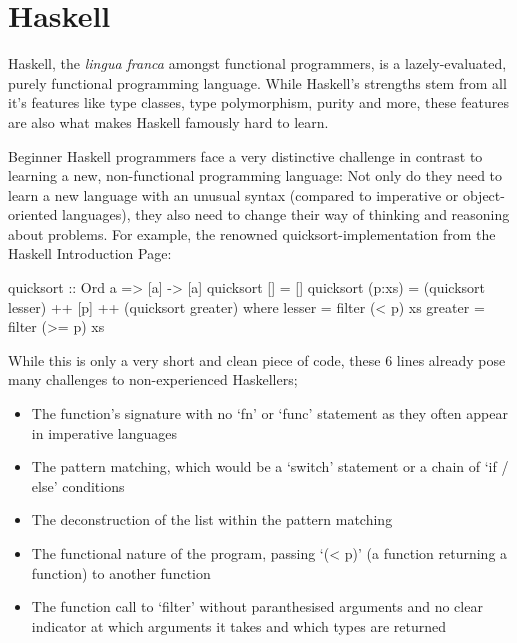 \section{Haskell}

Haskell, the \textit{lingua franca} amongst functional programmers, is a lazely-evaluated, purely functional programming
language. While Haskell's strengths stem from all it's features like type classes, type polymorphism, purity and more,
these features are also what makes Haskell famously hard to learn\autocite{haskell-hard-one}\autocite{haskell-hard-two}\autocite{haskell-hard-three}\autocite{haskell-hard-four}.

Beginner Haskell programmers face a very distinctive challenge in contrast to learning a new, non-functional programming language:
Not only do they need to learn a new language with an unusual syntax (compared to imperative or object-oriented languages), they
also need to change their way of thinking and reasoning about problems.
For example, the renowned quicksort-implementation from the Haskell Introduction Page\autocite{haskell-quicksort}:

\label{code:haskell-quicksort}
\begin{haskellcode}
quicksort :: Ord a => [a] -> [a]
quicksort []     = []
quicksort (p:xs) = (quicksort lesser) ++ [p] ++ (quicksort greater)
    where
        lesser  = filter (< p) xs
        greater = filter (>= p) xs
\end{haskellcode}

While this is only a very short and clean piece of code, these 6 lines already pose many challenges to non-experienced Haskellers;

\begin{itemize}
    \item The function's signature with no `fn' or `func' statement as they often appear in imperative languages
    \item The pattern matching, which would be a `switch' statement or a chain of `if / else' conditions
    \item The deconstruction of the list within the pattern matching
    \item The functional nature of the program, passing `(< p)' (a function returning a function) to another function
    \item The function call to `filter' without paranthesised arguments and no clear indicator at which arguments
        it takes and which types are returned
\end{itemize}

